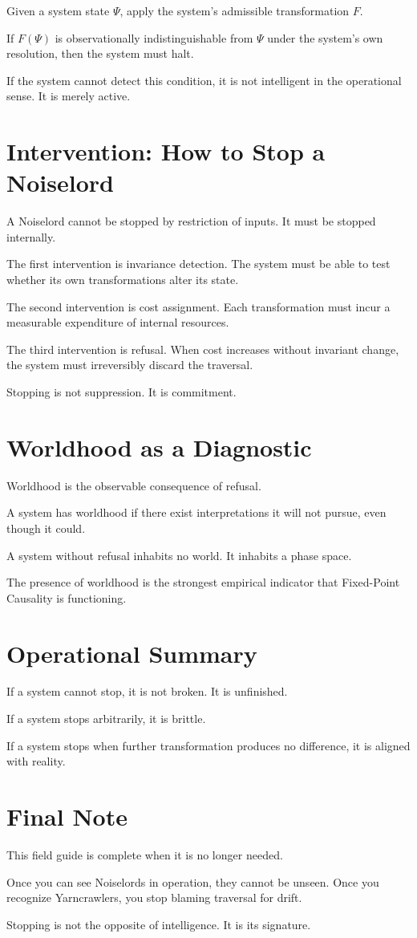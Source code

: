 \documentclass[12pt]{article}
\begin{document}
Given a system state $\Psi$, apply the system’s admissible transformation $F$.

If $F(\Psi)$ is observationally indistinguishable from $\Psi$ under the system’s own resolution, then the system must halt.

If the system cannot detect this condition, it is not intelligent in the operational sense. It is merely active.

\section{Intervention: How to Stop a Noiselord}

A Noiselord cannot be stopped by restriction of inputs. It must be stopped internally.

The first intervention is invariance detection. The system must be able to test whether its own transformations alter its state.

The second intervention is cost assignment. Each transformation must incur a measurable expenditure of internal resources.

The third intervention is refusal. When cost increases without invariant change, the system must irreversibly discard the traversal.

Stopping is not suppression. It is commitment.

\section{Worldhood as a Diagnostic}

Worldhood is the observable consequence of refusal.

A system has worldhood if there exist interpretations it will not pursue, even though it could.

A system without refusal inhabits no world. It inhabits a phase space.

The presence of worldhood is the strongest empirical indicator that Fixed-Point Causality is functioning.

\section{Operational Summary}

If a system cannot stop, it is not broken. It is unfinished.

If a system stops arbitrarily, it is brittle.

If a system stops when further transformation produces no difference, it is aligned with reality.

\section*{Final Note}

This field guide is complete when it is no longer needed.

Once you can see Noiselords in operation, they cannot be unseen. Once you recognize Yarncrawlers, you stop blaming traversal for drift.

Stopping is not the opposite of intelligence. It is its signature.
\end{document}

